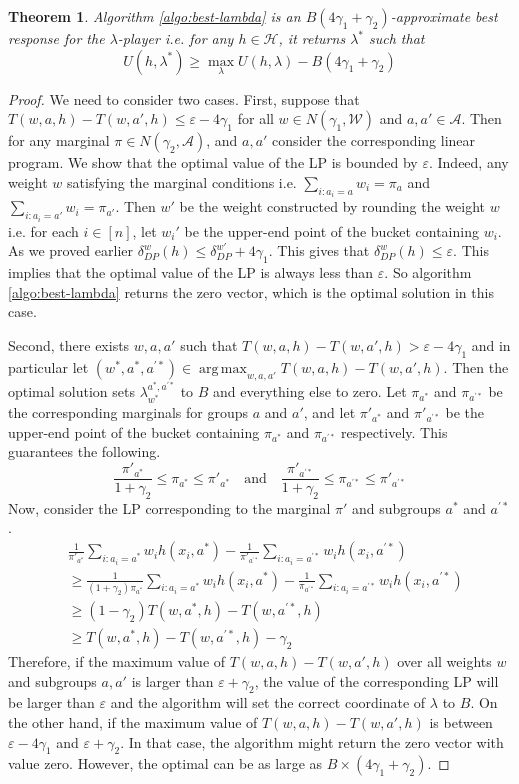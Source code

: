\documentclass[11pt]{article}
\newtheorem{theorem}{Theorem}
\DeclareMathOperator*{\argmax}{arg\,max}
\newcommand{\WW}{\mathcal{W}}
\newcommand{\Ac}{\mathcal{A}}
\newcommand{\HH}{\mathcal{H}}
\newcommand{\eps}{\varepsilon}
\begin{document}
\begin{theorem}
Algorithm \ref{algo:best-lambda} is an $B(4\gamma_1 + \gamma_2)$-approximate best response for the $\lambda$-player i.e. for any $h \in \HH$, it returns $\lambda^*$ such that
$$U(h,\lambda^*) \ge \max_{\lambda} U(h,\lambda) - B(4\gamma_1 + \gamma_2)$$
\end{theorem}
\begin{proof}
We need to consider two cases. First, suppose that $T(w,a,h) - T(w,a',h) \le \eps - 4\gamma_1$ for all $w \in N(\gamma_1,\WW)$ and $a,a' \in \Ac$. Then for any marginal $\pi \in N(\gamma_2,\Ac)$, and $a,a'$ consider the corresponding linear program. We show that the optimal value of the LP is bounded by $\eps$. Indeed, any weight $w$ satisfying the marginal conditions i.e. $\sum_{i:a_i = a}w_i = \pi_a$ and $\sum_{i:a_i = a'}w_i = \pi_{a'}$. Then $w'$ be the weight constructed by rounding the weight $w$ i.e. for each $i \in [n]$, let $w_i'$ be the upper-end point of the bucket containing $w_i$. As we proved earlier $\delta^w_{DP}(h) \le \delta^{w'}_{DP} + 4\gamma_1$. This gives that $\delta^w_{DP}(h) \le \eps$. This implies that the optimal value of the LP is always less than $\eps$. So algorithm \ref{algo:best-lambda} returns the zero vector, which is the optimal solution in this case.

Second, there exists $w,a,a'$ such that $T(w,a,h) - T(w,a',h) > \eps - 4\gamma_1$ and in particular let $(w^*,a^*,a^{'*}) \in \argmax_{w,a,a'} T(w,a,h) - T(w,a',h)$. Then the optimal solution sets $\lambda^{a^*,a^{'*}}_{w^*}$ to $B$ and everything else to zero. Let $\pi_{a^*}$ and $\pi_{a^{'*}}$ be the corresponding marginals for groups $a$ and $a'$, and let $\pi'_{a^*}$ and $\pi'_{a^{'*}}$ be the upper-end point of the bucket containing $\pi_{a^*}$ and $\pi_{a^{'*}}$ respectively. This guarantees the following.
$$ \frac{\pi'_{a^*}}{1 + \gamma_2} \le \pi_{a^*} \le \pi'_{a^*} \quad \text{and} \quad \frac{\pi'_{a^{'*}}}{1 + \gamma_2} \le \pi_{a^{'*}} \le \pi'_{a^{'*}} $$
Now, consider the LP corresponding to the marginal $\pi'$ and subgroups $a^*$ and $a^{'*}$. 
\begin{align*}
&\frac{1}{\pi'_{a^*}} \sum_{i:a_i = a^*} w_i h(x_i,a^*) - \frac{1}{\pi'_{a^{'*}}} \sum_{i:a_i = a^{'*}} w_i h(x_i,a^{'*}) \\
&\ge \frac{1}{(1+\gamma_2) \pi_{a^*}} \sum_{i:a_i = a^*} w_i h(x_i,a^*) - \frac{1}{\pi_{a^{'*}}} \sum_{i:a_i = a^{'*}} w_i h(x_i,a^{'*})  \\
&\ge (1-\gamma_2) T(w,a^*,h) - T(w,a^{'*},h)\\
&\ge T(w,a^*,h) - T(w,a^{'*},h) - \gamma_2
\end{align*}
Therefore, if the maximum value of $T(w,a,h) - T(w,a',h)$ over all weights $w$ and subgroups $a,a'$ is larger than $\eps + \gamma_2$, the value of the corresponding LP will be larger than $\eps$ and the algorithm will set the correct coordinate of $\lambda$ to $B$. On the other hand, if the maximum value of $T(w,a,h) - T(w,a',h)$ is between $\eps - 4\gamma_1$ and $\eps+\gamma_2$. In that case, the algorithm might return the zero vector with value zero. However, the optimal can be as large as $B \times (4\gamma_1 + \gamma_2)$.
\end{proof}
\end{document}
